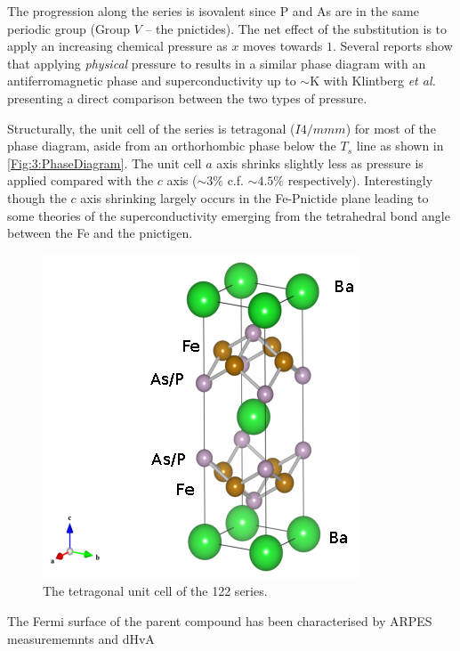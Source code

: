  The progression along the series is isovalent since P and As are in the same periodic group (Group $V$ -- the pnictides). The net effect of the substitution is to apply an increasing chemical pressure as $x$ moves towards $1$. Several reports show that applying \textit{physical} pressure to \BaFeAs results in a similar phase diagram with an antiferromagnetic phase and superconductivity up to $\sim$\unit[30]{K}\cite{Yamazaki2010,Colombier2009,Alireza2009} with Klintberg \textit{et al.}\cite{Klintberg2010} presenting a direct comparison between the two types of pressure. 

Structurally, the unit cell of the series is tetragonal ($I4/mmm$) for most of the phase diagram, aside from an orthorhombic phase below the $T_s$ line as shown in \fig\ref{Fig:3:PhaseDiagram}. The unit cell $a$ axis shrinks slightly less as pressure is applied compared with the $c$ axis ($\sim3\%$ c.f. $\sim4.5\%$ respectively). Interestingly though the $c$ axis shrinking largely occurs in the Fe-Pnictide plane leading to some theories of the superconductivity emerging from the tetrahedral bond angle between the Fe and the pnictigen. %

\begin{figure}
    \begin{center}
        \includegraphics[scale=1.0]{Chapter3-dHvABaFe2P2/Figures/BaFe2P2Series/UnitCell/UnitCell}
        \caption{The tetragonal unit cell of the 122 \BaFePAs series.}
        \label{Fig:3:UnitCell}
    \end{center}
\end{figure}

The Fermi surface of the parent compound \BaFeAs has been characterised by ARPES measurememnts\cite{Kondo2010a} and dHvA\cite{Terashima2011, Analytis2010b}



